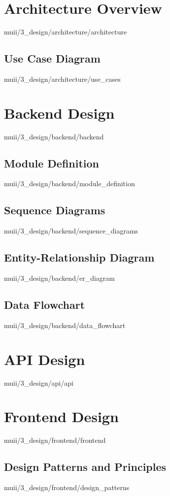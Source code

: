\documentclass[english,epsbased,copyright,final,printable,covers,extendedindex,firstnumbered,tfm,gnuplot,loc,loe,lof,lot]{tfgtfmthesisuam}
\begin{document}
    \section{Architecture Overview\label{SEC:ARCH}}{muii/3_design/architecture/architecture}
      \subsection{Use Case Diagram\label{SS:USECASEDIAG}}{muii/3_design/architecture/use_cases}

    \section{Backend Design\label{SEC:BACKDESIGN}}{muii/3_design/backend/backend}
      \subsection{Module Definition\label{SS:MODULEDEF}}{muii/3_design/backend/module_definition}
      \subsection{Sequence Diagrams\label{SS:SEQUENCEDIAG}}{muii/3_design/backend/sequence_diagrams}
      \subsection{Entity-Relationship Diagram\label{SS:DATABASEDIAG}}{muii/3_design/backend/er_diagram}
      \subsection{Data Flowchart\label{SS:DATAFLOW}}{muii/3_design/backend/data_flowchart}

    \section{API Design\label{SEC:APIDESIGN}}{muii/3_design/api/api}

    \section{Frontend Design\label{SEC:FRONTDESIGN}}{muii/3_design/frontend/frontend}
      \subsection{Design Patterns and Principles\label{SS:PATTPRINC}}{muii/3_design/frontend/design_patterns}
\end{document}
